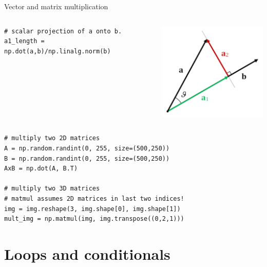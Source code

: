 \documentclass[compress%
,aspectratio=169%
]{beamer}
\begin{document}
\begin{frame}[fragile]{Vector and matrix multiplication}
    
\begin{columns}
\begin{lstlisting}
# scalar projection of a onto b.
a1_length = np.dot(a,b)/np.linalg.norm(b)
\end{lstlisting}
\includegraphics[width=0.8\linewidth]{mpimgbeamertheme/img/scalar_projection.png}
\end{columns}

\begin{lstlisting}
# multiply two 2D matrices
A = np.random.randint(0, 255, size=(500,250)) 
B = np.random.randint(0, 255, size=(500,250))
AxB = np.dot(A, B.T)

# multiply two 3D matrices
# matmul assumes 2D matrices in last two indices!
img = img.reshape(3, img.shape[0], img.shape[1])
mult_img = np.matmul(img, img.transpose((0,2,1)))
\end{lstlisting}
\end{frame}

\section{Loops and conditionals}
\end{document}
